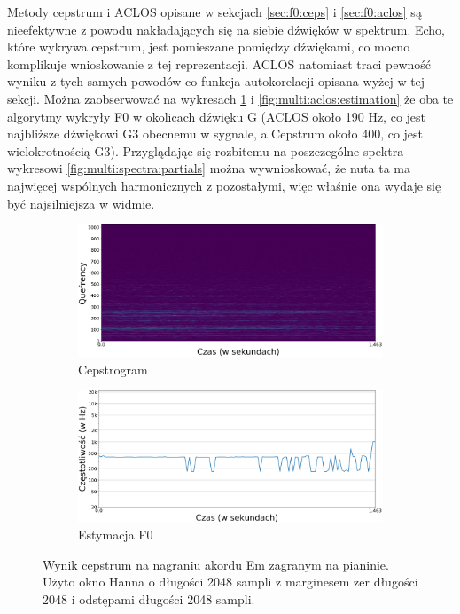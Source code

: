 \documentclass[12pt,a4paper,twoside]{mwart}
\begin{document}
Metody cepstrum i ACLOS opisane w sekcjach \ref{sec:f0:ceps} i \ref{sec:f0:aclos} są nieefektywne z powodu nakładających się na siebie dźwięków w spektrum. Echo, które wykrywa cepstrum, jest pomieszane pomiędzy dźwiękami, co mocno komplikuje wnioskowanie z tej reprezentacji. ACLOS natomiast traci pewność wyniku z tych samych powodów co funkcja autokorelacji opisana wyżej w tej sekcji. Można zaobserwować na wykresach \ref{fig:multi:ceps:estimation} i \ref{fig:multi:aclos:estimation} że oba te algorytmy wykryły F0 w okolicach dźwięku G (ACLOS około 190 Hz, co jest najbliższe dźwiękowi G3 obecnemu w sygnale, a Cepstrum około 400, co jest wielokrotnością G3). Przyglądając się rozbitemu na poszczególne spektra wykresowi \ref{fig:multi:spectra:partials} można wywnioskować, że nuta ta ma najwięcej wspólnych harmonicznych z pozostałymi, więc właśnie ona wydaje się być najsilniejsza w widmie.

\begin{figure}[h]
  \begin{subfigure}{0.5\textwidth}
    \includegraphics[width=1.\linewidth]{images/Em/cepstrogram_cropped.png}
    \caption{Cepstrogram}
  \end{subfigure}
  \begin{subfigure}{0.49\textwidth}
    \includegraphics[width=1.\linewidth]{images/Em/cepstra_estimation_cropped.png}
    \caption{Estymacja F0}
    \label{fig:multi:ceps:estimation}
  \end{subfigure}
  \caption{Wynik cepstrum na nagraniu akordu Em zagranym na pianinie. Użyto okno Hanna o długości 2048 sampli z marginesem zer długości 2048 i odstępami długości 2048 sampli.}
  \label{fig:multi:ceps}
\end{figure}
\end{document}
